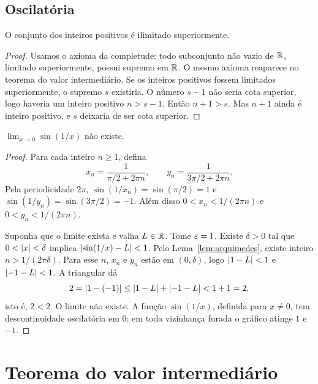 \documentclass[11pt,a4paper]{article}
\begin{document}

\subsection{Oscilat\'oria}

\begin{lema}
\label{lem:arquimedes}
O conjunto dos inteiros positivos \'e ilimitado superiormente.
\end{lema}

\begin{proof}
Usamos o axioma da completude: todo subconjunto n\~ao vazio de $\mathbb{R}$, limitado superiormente, possui supremo em $\mathbb{R}$. O mesmo axioma reaparece no teorema do valor intermedi\'ario. Se os inteiros positivos fossem limitados superiormente, o supremo $s$ existiria. O n\'umero $s-1$ n\~ao seria cota superior, logo haveria um inteiro positivo $n>s-1$. Ent\~ao $n+1>s$. Mas $n+1$ ainda \'e inteiro positivo, e $s$ deixaria de ser cota superior.
\end{proof}

\begin{teorema}
\label{teo:sen-um-sobre}
$\lim_{x\to 0}\sin(1/x)$ n\~ao existe.
\end{teorema}

\begin{proof}
Para cada inteiro $n\ge 1$, defina
\[
x_n=\frac{1}{\pi/2+2\pi n}, \qquad y_n=\frac{1}{3\pi/2+2\pi n}.
\]
Pela periodicidade $2\pi$, $\sin(1/x_n)=\sin(\pi/2)=1$ e $\sin(1/y_n)=\sin(3\pi/2)=-1$. Al\'em disso $0<x_n<1/(2\pi n)$ e $0<y_n<1/(2\pi n)$.

Suponha que o limite exista e valha $L\in\mathbb{R}$. Tome $\varepsilon=1$. Existe $\delta>0$ tal que $0<\left\lvert x \right\rvert<\delta$ implica $\left\lvert \sin(1/x)-L \right\rvert<1$. Pelo Lema~\ref{lem:arquimedes}, existe inteiro $n>1/(2\pi\delta)$. Para esse $n$, $x_n$ e $y_n$ est\~ao em $(0,\delta)$, logo $\left\lvert 1-L \right\rvert<1$ e $\left\lvert -1-L \right\rvert<1$. A triangular d\'a
\[
2=\left\lvert 1-(-1) \right\rvert\le \left\lvert 1-L \right\rvert+\left\lvert -1-L \right\rvert<1+1=2,
\]
isto \'e, $2<2$. O limite n\~ao existe. A fun\c{c}\~ao $\sin(1/x)$, definida para $x\neq 0$, tem descontinuidade oscilat\'oria em $0$: em toda vizinhan\c{c}a furada o gr\'afico atinge $1$ e $-1$.
\end{proof}

\section{Teorema do valor intermedi\'ario}
\label{sec:tvi}
\end{document}
